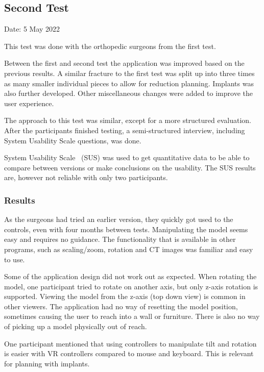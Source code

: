 \documentclass[a4paper]{report}
\begin{document}

\subsection{Second Test}
Date: 5 May 2022

This test was done with the orthopedic surgeons from the first test. 

Between the first and second test the application was improved based on the previous results. 
A similar fracture to the first test was split up into three times as many smaller individual pieces to allow for reduction planning. 
Implants was also further developed.
Other miscellaneous changes were added to improve the user experience.

The approach to this test was similar, except for a more structured evaluation. After the participants finished testing, a semi-structured interview, including System Usability Scale questions, was done.

System Usability Scale~\cite{system_usability_scale_sus_system_2013} (SUS) was used to get quantitative data to be able to compare between versions or make conclusions on the usability. The SUS results are, however not reliable with only two participants.

\subsubsection{Results}
As the surgeons had tried an earlier version, they quickly got used to the controls, even with four months between tests. 
Manipulating the model seems easy and requires no guidance. The functionality that is available in other programs, such as scaling/zoom, rotation and CT images was familiar and easy to use.

Some of the application design did not work out as expected.
When rotating the model, one participant tried to rotate on another axis, but only z-axis rotation is supported. Viewing the model from the z-axis (top down view) is common in other viewers.
The application had no way of resetting the model position, sometimes causing the user to reach into a wall or furniture. There is also no way of picking up a model physically out of reach.


One participant mentioned that using controllers to manipulate tilt and rotation is easier with VR controllers compared to mouse and keyboard. This is relevant for planning with implants.
\end{document}
